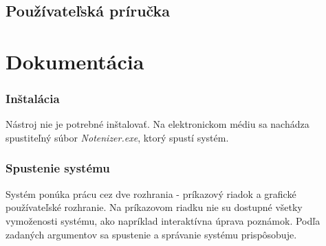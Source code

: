 \newpage
{}
{
	\section{Používateľská príručka}
}
{
	\chapter{Dokumentácia}
}

\subsection{Inštalácia}
Nástroj nie je potrebné inštalovať. Na elektronickom médiu sa nachádza spustiteľný súbor \textit{Notenizer.exe}, ktorý spustí systém.

\subsection{Spustenie systému}
Systém ponúka prácu cez dve rozhrania - príkazový riadok a grafické používateľské rozhranie. Na príkazovom riadku nie su dostupné všetky vymoženosti systému, ako napríklad interaktívna úprava poznámok. Podľa zadaných argumentov sa spustenie a správanie systému prispôsobuje.


